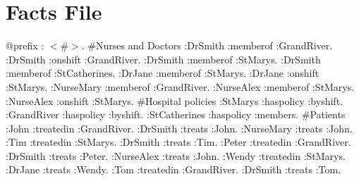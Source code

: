 \documentclass[conference]{IEEEtran}
\begin{document}
\onecolumn

\section{Facts File}
\label{sec:facts-file}

@prefix : $<\#>$. \newline
\newline
\#Nurses and Doctors \newline
:DrSmith :memberof :GrandRiver.\newline
:DrSmith :onshift :GrandRiver.\newline
:DrSmith :memberof :StMarys.\newline
:DrSmith :memberof :StCatherines.\newline
\newline
:DrJane :memberof :StMarys.\newline
:DrJane :onshift :StMarys.\newline
\newline
:NurseMary :memberof :GrandRiver.\newline
:NurseAlex :memberof :StMarys.\newline
:NurseAlex :onshift :StMarys.\newline
\newline
\#Hospital policies\newline
:StMarys :haspolicy :byshift.\newline
:GrandRiver :haspolicy :byshift.\newline
:StCatherines :haspolicy :members.\newline
\newline
\#Patients\newline
:John :treatedin :GrandRiver.\newline
:DrSmith :treats :John.\newline
:NurseMary :treats :John.\newline
:Tim :treatedin :StMarys.\newline
:DrSmith :treats :Tim.\newline
:Peter :treatedin :GrandRiver.\newline
:DrSmith :treats :Peter.\newline
:NurseAlex :treats :John.\newline
:Wendy :treatedin :StMarys.\newline
:DrJane :treats :Wendy.\newline
:Tom :treatedin :GrandRiver.\newline
:DrSmith :treats :Tom.\newline
\end{document}
